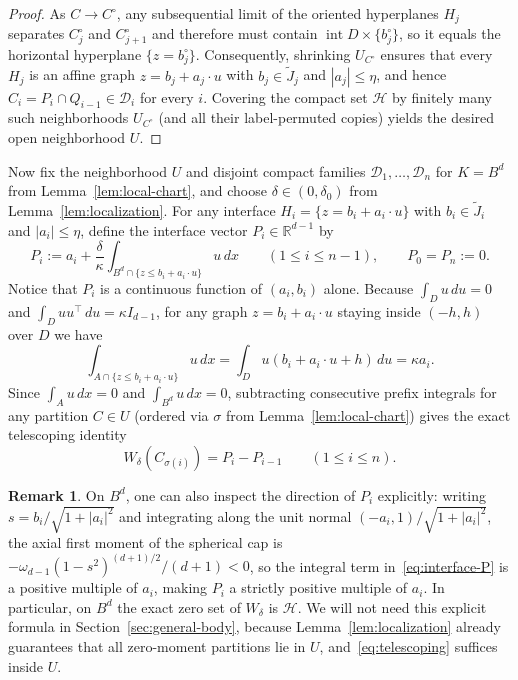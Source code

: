 \documentclass[11pt,a4paper]{amsart}
\numberwithin{equation}{section}
\theoremstyle{definition}
\newtheorem{remark}[theorem]{Remark}
\newcommand{\R}{\mathbb{R}}
\newcommand{\Hcal}{\mathcal{H}}
\newcommand{\Dcal}{\mathcal{D}}
\newcommand{\inte}{\operatorname{int}}
\begin{document}
\begin{proof}
As $C \to C^\circ$, any subsequential limit of the oriented hyperplanes $H_j$ separates $C^\circ_j$ and $C^\circ_{j+1}$ and therefore must contain $\inte D \times \{b^\circ_j\}$, so it equals the horizontal hyperplane $\{z = b^\circ_j\}$. Consequently, shrinking $U_{C^\circ}$ ensures that every $H_j$ is an affine graph $z = b_j + a_j \cdot u$ with $b_j \in \widetilde J_j$ and $|a_j| \le \eta$, and hence $C_i = P_i \cap Q_{i-1} \in \Dcal_i$ for every $i$. Covering the compact set $\Hcal$ by finitely many such neighborhoods $U_{C^\circ}$ (and all their label-permuted copies) yields the desired open neighborhood $U$.
\end{proof}

Now fix the neighborhood $U$ and disjoint compact families $\Dcal_1, \dots, \Dcal_n$ for $K = B^d$ from Lemma~\ref{lem:local-chart}, and choose $\delta \in (0, \delta_0)$ from Lemma~\ref{lem:localization}. For any interface $H_i = \{z = b_i + a_i \cdot u\}$ with $b_i \in \widetilde J_i$ and $|a_i| \le \eta$, define the interface vector $P_i \in \R^{d-1}$ by
\begin{equation}
\label{eq:interface-P}
P_i := a_i + \frac{\delta}{\kappa} \int_{B^d \cap \{z \le b_i + a_i \cdot u\}} u \, dx \qquad (1 \le i \le n-1), \qquad P_0 = P_n := 0.
\end{equation}
Notice that $P_i$ is a continuous function of $(a_i, b_i)$ alone. Because $\int_D u \, du = 0$ and $\int_D u u^\top \, du = \kappa I_{d-1}$, for any graph $z = b_i + a_i \cdot u$ staying inside $(-h, h)$ over $D$ we have
\[
\int_{A \cap \{z \le b_i + a_i \cdot u\}} u \, dx = \int_D u (b_i + a_i \cdot u + h)\, du = \kappa a_i.
\]
Since $\int_A u \, dx = 0$ and $\int_{B^d} u \, dx = 0$, subtracting consecutive prefix integrals for any partition $C \in U$ (ordered via $\sigma$ from Lemma~\ref{lem:local-chart}) gives the exact telescoping identity
\begin{equation}
\label{eq:telescoping}
W_\delta(C_{\sigma(i)}) = P_i - P_{i-1} \qquad (1 \le i \le n).
\end{equation}

\begin{remark}
\label{rem:ball-cap-direction}
On $B^d$, one can also inspect the direction of $P_i$ explicitly: writing $s = b_i / \sqrt{1 + |a_i|^2}$ and integrating along the unit normal $(-a_i, 1)/\sqrt{1 + |a_i|^2}$, the axial first moment of the spherical cap is $-\omega_{d-1} (1 - s^2)^{(d+1)/2} / (d+1) < 0$, so the integral term in~\eqref{eq:interface-P} is a positive multiple of $a_i$, making $P_i$ a strictly positive multiple of $a_i$. In particular, on $B^d$ the exact zero set of $W_\delta$ is $\Hcal$. We will not need this explicit formula in Section~\ref{sec:general-body}, because Lemma~\ref{lem:localization} already guarantees that all zero-moment partitions lie in $U$, and~\eqref{eq:telescoping} suffices inside $U$.
\end{remark}
\end{document}

